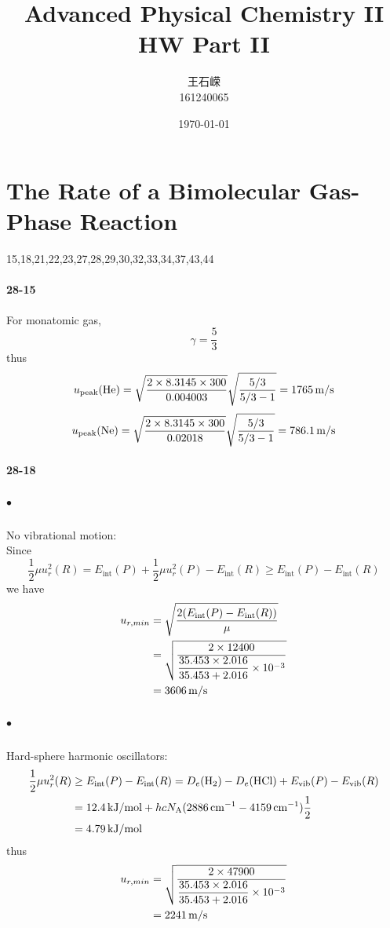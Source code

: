 \documentclass[a4paper]{article}
\title{\textbf{Advanced Physical Chemistry II}\\HW   Part II}
\author{王石嵘
\vspace{5pt}\\
161240065\\
}
\date{\today} %
\newcommand{\NA}{N_\mathrm{A}}
\newcommand{\ex}[1]{\paragraph{28-#1}}
\newcommand{\subex}[1]{\subparagraph{#1}}
\numberwithin{equation}{section}
\begin{document}

\maketitle



\setcounter{section}{27}
\section{The Rate of a Bimolecular Gas-Phase Reaction}
15,18,21,22,23,27,28,29,30,32,33,34,37,43,44\\

\ex{15}
For monatomic gas,
\begin{equation}\label{key}
\gamma = \dfrac{5}{3}
\end{equation}
thus
\begin{equation}\label{key}
u_{\text{peak}}(\ce{He}) = \sqrt{\dfrac{2\times 8.3145\times 300}{0.004003}}\sqrt{\dfrac{5/3}{5/3-1}} = \SI{1765}{m/s}
\end{equation}
\begin{equation}\label{key}
u_{\text{peak}}(\ce{Ne}) = \sqrt{\dfrac{2\times 8.3145\times 300}{0.02018}}\sqrt{\dfrac{5/3}{5/3-1}} = \SI{786.1}{m/s}
\end{equation}

\ex{18}
\subex{$ \bullet $} No vibrational motion:\\
Since 
\begin{equation}\label{key}
\dfrac{1}{2}\mu u_r^2(R) = E_{\text{int}}(P) + \dfrac{1}{2}\mu u_r^2(P) -  E_{\text{int}}(R) \geq E_{\text{int}}(P)  -  E_{\text{int}}(R) 
\end{equation}
we have
\begin{align}
u_{r,min} &= \sqrt{\dfrac{2 (E_{\text{int}}(P)  -  E_{\text{int}}(R) )}{\mu}} \notag\\
&= \sqrt{\dfrac{2\times 12400}{\dfrac{35.453\times 2.016}{35.453+2.016}\times 10^{-3}}} \notag\\
&= \SI{3606}{m/s}
\end{align}
\subex{$ \bullet $} Hard-sphere harmonic oscillators:\\
\begin{align}\label{key}
\dfrac{1}{2}\mu u_r^2(R) &\geq E_{\text{int}}(P)  -  E_{\text{int}}(R) = D_e(\ce{H_2}) - D_e(\ce{HCl}) + E_{\text{vib}}(P) - E_{\text{vib}}(R) \notag\\
&= \SI{12.4}{kJ/mol} + hc\NA(\SI{2886}{cm^{-1}} - \SI{4159}{cm^{-1}})\dfrac{1}{2} \notag\\
&= \SI{4.79}{kJ/mol}
\end{align}
thus
\begin{align}
u_{r,min} %
&= \sqrt{\dfrac{2\times 47900}{\dfrac{35.453\times 2.016}{35.453+2.016}\times 10^{-3}}} \notag\\
&= \SI{2241}{m/s}
\end{align}
\end{document}
